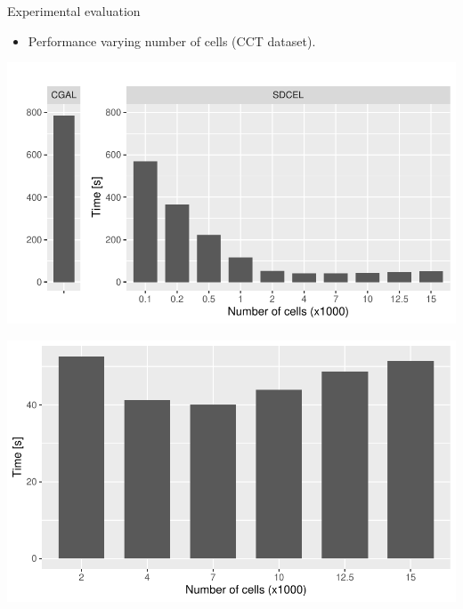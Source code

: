 \documentclass{beamer}
\begin{document}
    \begin{frame}{Experimental evaluation}
        \begin{itemize}
            \item Performance varying number of cells (CCT dataset).
        \end{itemize}
        \vspace{1cm}
    
        \begin{minipage}{0.49\textwidth}
            \centering
            \includegraphics[width=\textwidth]{figures/ca}
        \end{minipage}\hfill %
        \begin{minipage}{0.49\textwidth}
            \centering
            \includegraphics[width=\textwidth]{figures/ca_sample}
        \end{minipage}
    \end{frame}    
\end{document}
